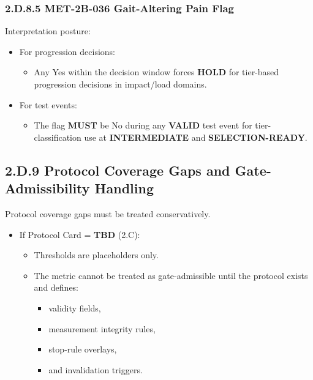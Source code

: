 \documentclass[10pt]{article}
\begin{document}
\subsubsection*{2.D.8.5 \textbf{MET-2B-036} Gait-Altering Pain Flag}

Interpretation posture:

\begin{itemize}
\item For progression decisions:
  \begin{itemize}
  \item Any Yes within the decision window forces \textbf{HOLD} for tier-based progression decisions in impact/load domains.
  \end{itemize}
\item For test events:
  \begin{itemize}
  \item The flag \textbf{MUST} be No during any \textbf{VALID} test event for tier-classification use at \textbf{INTERMEDIATE} and \textbf{SELECTION-READY}.
  \end{itemize}
\end{itemize}

\clearpage
\subsection*{2.D.9 Protocol Coverage Gaps and Gate-Admissibility Handling}
{}

Protocol coverage gaps must be treated conservatively.

\begin{itemize}
\item If Protocol Card = \textbf{TBD} (2.C):
  \begin{itemize}
  \item Thresholds are placeholders only.
  \item The metric cannot be treated as gate-admissible until the protocol exists and defines:
    \begin{itemize}
    \item validity fields,
    \item measurement integrity rules,
    \item stop-rule overlays,
    \item and invalidation triggers.
    \end{itemize}
  \end{itemize}
\end{itemize}
\end{document}
